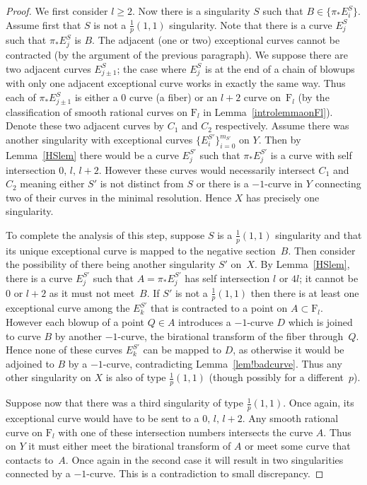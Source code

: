 \documentclass[11pt]{amsbook}
\theoremstyle{definition}
\theoremstyle{definition}
\theoremstyle{definition}
\theoremstyle{definition}
\theoremstyle{definition}
\theoremstyle{definition}
\theoremstyle{definition}
\theoremstyle{definition}
\newcommand{\F}{\mathrm{F}}
\begin{document}
\begin{proof}
We first consider $l\geq 2$. Now there is a singularity $S$ such that $B \in \{ \pi_*E_i^S \}$. Assume first that $S$ is not a $\frac{1}{p}(1,1)$ singularity. Note that there is a curve $E_j^S$ such that $\pi_* E_j^S$ is $B$. The adjacent (one or two) exceptional curves cannot be contracted (by the argument of the previous paragraph). We suppose there are two adjacent curves $E_{j\pm 1}^S$; the case where $E_j^S$ is at the end of a chain of blowups with only one adjacent exceptional curve works in exactly the same way. Thus each of $\pi_*E_{j\pm 1}^S$ is either a $0$ curve (a fiber) or an $l+2$ curve on~$\F_l$ (by the classification of smooth rational curves on $\F_l$ in Lemma~\ref{introlemmaonFl}).
Denote these two adjacent curves by $C_1$ and $C_2$ respectively. Assume there was another singularity with exceptional curves $\{ E_i^{S'} \}_{i=0}^{m_{S'}} $ on $Y$. Then by Lemma~\ref{HSlem} there would be a curve $E_j^{S'}$ such that $\pi_* E_j^{S'}$ is a curve with self intersection $0, \,  l,\,  l+2$. However these curves would necessarily intersect $C_1$ and $C_2$ meaning either $S'$ is not distinct from $S$ or there is a $-1$-curve in $Y$ connecting two of their curves in the minimal resolution. Hence $X$ has precisely one singularity. 

To complete the analysis of this step, suppose $S$ is a $\frac{1}{p}(1,1)$ singularity and that its unique exceptional curve is mapped to the negative section~$B$. Then consider the possibility of there being another singularity $S'$ on~$X$. By Lemma~\ref{HSlem}, there is a curve $E_j^{S'}$ such that $A=\pi_* E_j^{S'}$ has self intersection $l$ or $4l$; it cannot be $0$ or $l+2$ as it must not meet~$B$. If $S'$ is not a $\frac{1}{p}(1,1)$ then there is at least one exceptional curve among the $E_k^{S'}$ that is contracted to a point on $A\subset\F_l$. However each blowup of a point $Q\in A$ introduces a $-1$-curve $D$ which is joined to curve $B$ by another $-1$-curve, the birational transform of the fiber through~$Q$. Hence none of these curves $E_k^{S'}$ can be mapped to $D$, as otherwise it would be adjoined to $B$ by a $-1$-curve, contradicting Lemma~\ref{lem!badcurve}.
Thus any other singularity on $X$ is also of type $\frac{1}{p}(1,1)$ (though possibly for a different~$p$).

Suppose now that there was a third singularity of type $\frac{1}{p}(1,1)$. Once again, its exceptional curve would have to be sent to a $0, \, l, \, l+2$. Any smooth rational curve on $\F_l$ with one of these intersection numbers intersects the curve $A$. Thus on $Y$ it must either meet the birational transform of $A$ or meet some curve that contacts to~$A$. Once again in the second case it will result in two singularities connected by a $-1$-curve. This is a contradiction to small discrepancy.


\end{proof}
\end{document}
